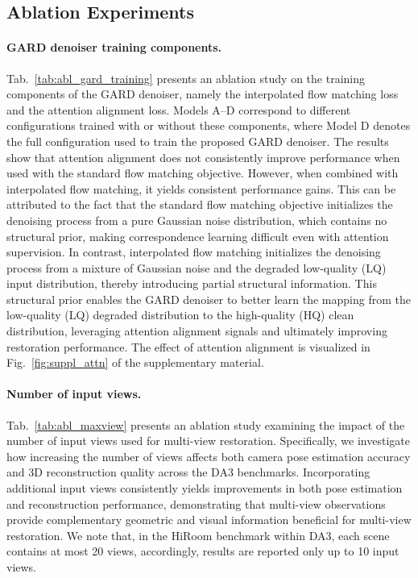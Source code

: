 \subsection{Ablation Experiments}


\paragraph{GARD denoiser training components.}
Tab.~\ref{tab:abl_gard_training} presents an ablation study on the training components of the GARD denoiser, namely the interpolated flow matching loss and the attention alignment loss. Models A--D correspond to different configurations trained with or without these components, where Model D denotes the full configuration used to train the proposed GARD denoiser. The results show that attention alignment does not consistently improve performance when used with the standard flow matching objective. However, when combined with interpolated flow matching, it yields consistent performance gains. This can be attributed to the fact that the standard flow matching objective initializes the denoising process from a pure Gaussian noise distribution, which contains no structural prior, making correspondence learning difficult even with attention supervision. In contrast, interpolated flow matching initializes the denoising process from a mixture of Gaussian noise and the degraded low-quality (LQ) input distribution, thereby introducing partial structural information. This structural prior enables the GARD denoiser to better learn the mapping from the low-quality (LQ) degraded distribution to the high-quality (HQ) clean distribution, leveraging attention alignment signals and ultimately improving restoration performance. The effect of attention alignment is visualized in Fig.~\ref{fig:suppl_attn} of the supplementary material.


\paragraph{Number of input views.}
Tab.~\ref{tab:abl_maxview} presents an ablation study examining the impact of the number of input views used for multi-view restoration. Specifically, we investigate how increasing the number of views affects both camera pose estimation accuracy and 3D reconstruction quality across the DA3 benchmarks. Incorporating additional input views consistently yields improvements in both pose estimation and reconstruction performance, demonstrating that multi-view observations provide complementary geometric and visual information beneficial for multi-view restoration. We note that, in the HiRoom benchmark within DA3, each scene contains at most 20 views, accordingly, results are reported only up to 10 input views.

